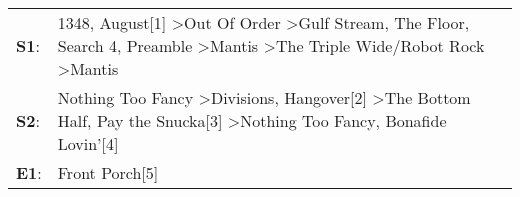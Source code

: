 \begin{supertabular}{p{0.03\textwidth}p{0.92\textwidth}}
 \textbf{S1}:  &  1348\textsuperscript{}, \enspace August[1]\textsuperscript{} \textgreater \enspace Out Of Order\textsuperscript{} \textgreater \enspace Gulf Stream\textsuperscript{}, \enspace The Floor\textsuperscript{}, \enspace Search 4\textsuperscript{}, \enspace Preamble\textsuperscript{} \textgreater \enspace Mantis\textsuperscript{} \textgreater \enspace The Triple Wide/Robot Rock\textsuperscript{} \textgreater \enspace Mantis\textsuperscript{}  \enspace  \\
 \textbf{S2}:  &                                                                                                            Nothing Too Fancy\textsuperscript{} \textgreater \enspace Divisions\textsuperscript{}, \enspace Hangover[2]\textsuperscript{} \textgreater \enspace The Bottom Half\textsuperscript{}, \enspace Pay the Snucka[3]\textsuperscript{} \textgreater \enspace Nothing Too Fancy\textsuperscript{}, \enspace Bonafide Lovin'[4]\textsuperscript{}  \enspace  \\
 \textbf{E1}:  &                                                                                                                                                                                                                                                                                                                                                                                                                        Front Porch[5]\textsuperscript{}  \enspace  \\
\end{supertabular}
